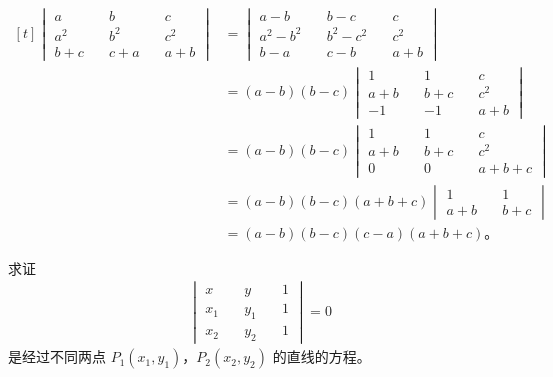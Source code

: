 \zhengming $\begin{aligned}[t]
    \begin{vmatrix}
        a     \quad & b     \quad & c \\
        a^2   \quad & b^2   \quad & c^2 \\
        b + c \quad & c + a \quad & a + b
    \end{vmatrix}
    &=  \begin{vmatrix}
            a - b     \quad & b - c     \quad & c \\
            a^2 - b^2 \quad & b^2 - c^2 \quad & c^2 \\
            b - a     \quad & c - b     \quad & a + b
        \end{vmatrix} \\
    &= (a - b)(b - c)
        \begin{vmatrix}
            1     \quad & 1     \quad & c \\
            a + b \quad & b + c \quad & c^2 \\
            -1    \quad & -1    \quad & a + b
        \end{vmatrix} \\
    &= (a - b)(b - c)
        \begin{vmatrix}
            1     \quad & 1     \quad & c \\
            a + b \quad & b + c \quad & c^2 \\
            0     \quad & 0     \quad & a + b + c
        \end{vmatrix} \\
    &= (a - b)(b - c)(a + b + c)
        \begin{vmatrix}
            1     \quad & 1 \\
            a + b \quad & b + c
        \end{vmatrix} \\
    &= (a - b)(b - c)(c - a)(a + b + c) \text{。}
\end{aligned}$



\liti 求证
\begin{gather*}
    \begin{vmatrix*}
        x   \quad & y   \quad & 1 \\
        x_1 \quad & y_1 \quad & 1 \\
        x_2 \quad & y_2 \quad & 1
    \end{vmatrix*} = 0 \tag{*}\label{eq:sjhlszk-star}
\end{gather*}
是经过不同两点 $P_1(x_1, y_1)$，$P_2(x_2, y_2)$ 的直线的方程。


